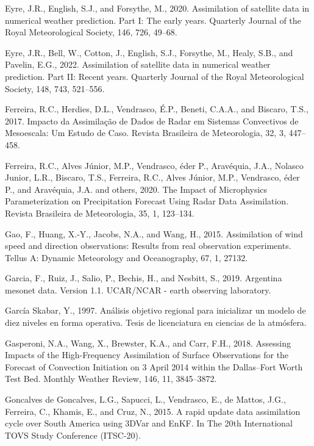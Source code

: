 \documentclass[12pt,oneside,a4paper]{reedthesis}
\begin{document}
\leavevmode\hypertarget{ref-eyre2020}{}%
Eyre, J.R., English, S.J., and Forsythe, M., 2020. Assimilation of satellite data in numerical weather prediction. Part I: The early years. Quarterly Journal of the Royal Meteorological Society, 146, 726, 49--68.

\leavevmode\hypertarget{ref-eyre2022}{}%
Eyre, J.R., Bell, W., Cotton, J., English, S.J., Forsythe, M., Healy, S.B., and Pavelin, E.G., 2022. Assimilation of satellite data in numerical weather prediction. Part II: Recent years. Quarterly Journal of the Royal Meteorological Society, 148, 743, 521--556.

\leavevmode\hypertarget{ref-ferreira2017}{}%
Ferreira, R.C., Herdies, D.L., Vendrasco, É.P., Beneti, C.A.A., and Biscaro, T.S., 2017. Impacto da Assimilação de Dados de Radar em Sistemas Convectivos de Mesoescala: Um Estudo de Caso. Revista Brasileira de Meteorologia, 32, 3, 447--458.

\leavevmode\hypertarget{ref-ferreira2020}{}%
Ferreira, R.C., Alves Júnior, M.P., Vendrasco, éder P., Aravéquia, J.A., Nolasco Junior, L.R., Biscaro, T.S., Ferreira, R.C., Alves Júnior, M.P., Vendrasco, éder P., and Aravéquia, J.A. and others, 2020. The Impact of Microphysics Parameterization on Precipitation Forecast Using Radar Data Assimilation. Revista Brasileira de Meteorologia, 35, 1, 123--134.

\leavevmode\hypertarget{ref-gao2015}{}%
Gao, F., Huang, X.-Y., Jacobs, N.A., and Wang, H., 2015. Assimilation of wind speed and direction observations: Results from real observation experiments. Tellus A: Dynamic Meteorology and Oceanography, 67, 1, 27132.

\leavevmode\hypertarget{ref-garcia2019}{}%
Garcia, F., Ruiz, J., Salio, P., Bechis, H., and Nesbitt, S., 2019. Argentina mesonet data. Version 1.1. UCAR/NCAR - earth observing laboratory.

\leavevmode\hypertarget{ref-garciaskabar1997}{}%
García Skabar, Y., 1997. Análisis objetivo regional para inicializar un modelo de diez niveles en forma operativa. Tesis de licenciatura en ciencias de la atmósfera.

\leavevmode\hypertarget{ref-gasperoni2018}{}%
Gasperoni, N.A., Wang, X., Brewster, K.A., and Carr, F.H., 2018. Assessing Impacts of the High-Frequency Assimilation of Surface Observations for the Forecast of Convection Initiation on 3 April 2014 within the Dallas--Fort Worth Test Bed. Monthly Weather Review, 146, 11, 3845--3872.

\leavevmode\hypertarget{ref-goncalvesdegoncalves2015}{}%
Goncalves de Goncalves, L.G., Sapucci, L., Vendrasco, E., de Mattos, J.G., Ferreira, C., Khamis, E., and Cruz, N., 2015. A rapid update data assimilation cycle over South America using 3DVar and EnKF. In The 20th International TOVS Study Conference (ITSC-20).
\end{document}

